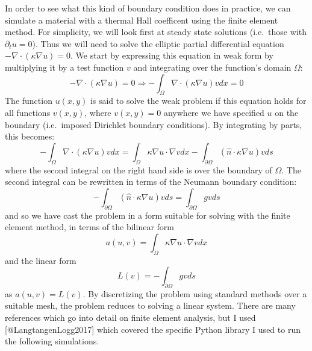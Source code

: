 \documentclass[12pt,]{article}
\begin{document}
In order to see what this kind of boundary condition does in practice,
we can simulate a material with a thermal Hall coefficent using the
finite element method. For simplicity, we will look first at steady
state solutions (i.e.~those with \(\partial_t u = 0\)). Thus we will
need to solve the elliptic partial differential equation
\(-\nabla \cdot (\kappa \nabla u) = 0\). We start by expressing this
equation in weak form by multiplying it by a test function \(v\) and
integrating over the function's domain \(\Omega\):
\[ -\nabla \cdot (\kappa \nabla u) = 0 \Rightarrow -\int_\Omega \nabla \cdot
(\kappa \nabla u) v dx = 0 \] The function \(u(x,y)\) is said to solve
the weak problem if this equation holds for all functions \(v(x,y)\),
where \(v(x, y) = 0\) anywhere we have specified \(u\) on the boundary
(i.e.~imposed Dirichlet boundary conditions). By integrating by parts,
this becomes:
\[ - \int_\Omega \nabla \cdot (\kappa \nabla u) v dx = \int_\Omega \kappa \nabla
u \cdot \nabla v dx - \int_{\partial \Omega} (\hat{n} \cdot \kappa\nabla u) v ds\]
where the second integral on the right hand side is over the boundary of
\(\Omega\). The second integral can be rewritten in terms of the Neumann
boundary condition:
\[ - \int_{\partial\Omega} (\hat{n} \cdot \kappa \nabla u) v ds =
\int_{\partial\Omega} g v ds\] and so we have cast the problem in a form
suitable for solving with the finite element method, in terms of the
bilinear form
\[ a(u, v) = \int_\Omega \kappa \nabla u \cdot \nabla v dx \] and the
linear form \[ L(v) = -\int_{\partial \Omega} g v ds \] as
\(a(u, v) = L(v)\). By discretizing the problem using standard methods
over a suitable mesh, the problem reduces to solving a linear system.
There are many references which go into detail on finite element
analysis, but I used {[}@LangtangenLogg2017{]} which covered the
specific Python library I used to run the following simulations.
\end{document}
